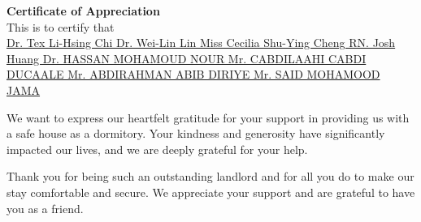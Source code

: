 \documentclass[a4paper, landscape]{article}
\newcommand{\members}[1]{%
    \ifcase#1
    \or Dr. Tex Li-Hsing Chi
    \or Dr. Wei-Lin Lin
    \or Miss Cecilia Shu-Ying Cheng
    \or RN. Josh Huang
    \or Dr. HASSAN MOHAMOUD NOUR %
    \or Mr. CABDILAAHI CABDI DUCAALE
    \or Mr. ABDIRAHMAN ABIB DIRIYE %
    \or Mr. SAID MOHAMOOD JAMA %
    \fi
}
\begin{document}
\begin{center}

{\Huge\textbf{Certificate of Appreciation}}\\[0.6cm]

\raisebox{-0.6\height}{}  \hspace{0.3cm}
This is to certify that \hspace{0.3cm}
\raisebox{-0.6\height}{} \\[0.4cm]

{\Huge\underline{\members{7}}}\\[0.2cm]



\begin{flushleft}
\Large
We want to express our heartfelt gratitude for your support in providing us with a safe house as a dormitory. Your kindness and generosity have significantly impacted our lives, and we are deeply grateful for your help.

Thank you for being such an outstanding landlord and for all you do to make our stay comfortable and secure. We appreciate your support and are grateful to have you as a friend.

\end{flushleft}\\[0.5cm]





\end{center}
\end{document}

